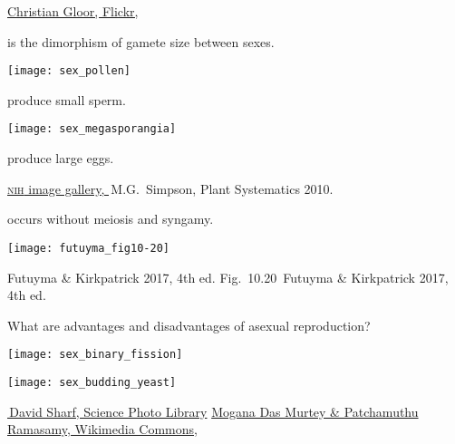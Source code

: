\documentclass[t]{beamer}
\newcommand{\futuyma}[1]{%
	\ifthenelse{\isempty{#1}}%
	{Futuyma \& Kirkpatrick 2017, 4th ed.}%
	{Fig.~#1~Futuyma \& Kirkpatrick 2017, 4th ed.}%
}
\begin{document}

{
\begin{frame}[b]

\tiny \textcolor{white}{\href{https://www.flickr.com/photos/76738608@N08/36518035882}{Christian Gloor, Flickr, }}
\end{frame}
}

\begin{frame}{ is the dimorphism of gamete size between sexes.}

\begin{multicols}{2}
\texttt{[image: sex\_pollen]}

 produce small sperm.


\columnbreak

\texttt{[image: sex\_megasporangia]}

 produce large eggs.

\end{multicols}


\vfilll

\tiny \href{https://www.flickr.com/photos/132318516@N08/26565353152}{\textsc{nih} image gallery, } \hfill
\textcopyright\,M.G.~Simpson, Plant Systematics 2010.
\end{frame}


\begin{frame}{ occurs without meiosis and syngamy.}

\texttt{[image: futuyma\_fig10-20]}

\tinyfill \futuyma{10.20}

\end{frame}



\begin{frame}{What are advantages and disadvantages of asexual reproduction?}

\begin{multicols}{2}

\texttt{[image: sex\_binary\_fission]}

\columnbreak

\texttt{[image: sex\_budding\_yeast]}
\end{multicols}

\vfilll

\tiny \href{https://www.sciencephoto.com/media/11784/view/dividing-bacterium-sem}{\textcopyright\,David Sharf, Science Photo Library} \hfill \href{https://commons.wikimedia.org/wiki/File:Saccharomyces_cerevisiae_SEM.jpg}{Mogana Das Murtey \& Patchamuthu Ramasamy, Wikimedia Commons, }


\end{frame}
\end{document}
